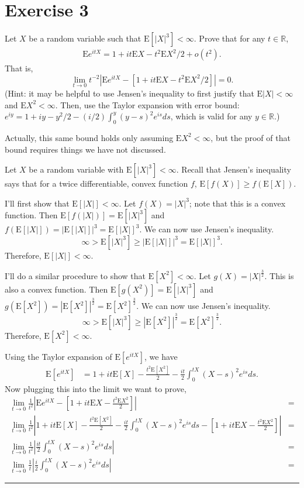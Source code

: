 \documentclass{article}
\theoremstyle{break}
\newenvironment{solution}{{\bf Solution:}}{\hfill\rule{2mm}{2mm}}
\newcommand{\E}{\mathrm{E}}
\newcommand{\R}{\mathbb{R}}
\begin{document}
\section*{Exercise 3}
Let $X$ be a random variable such that $\E[ |X|^{3}] <\infty$.  Prove that for any $t\in\R$,
\begin{align*}
\E e^{itX}=1+it\E X-t^{2}\E X^{2}/2+o(t^{2}).
\end{align*}
That is,
$$\lim_{t \rightarrow 0}t^{-2} |\E e^{itX}-[1+it\E X-t^{2}\E X^{2}/2]|=0.$$
(Hint: it may be helpful to use Jensen's inequality to first justify that $\E |X|<\infty$ and $\E X^{2}<\infty$.  Then, use the Taylor expansion with error bound: $e^{iy}=1+iy-y^{2}/2-(i/2)\int_{0}^{y}(y-s)^{2}e^{is}ds$, which is valid for any $y\in\R$.)

Actually, this same bound holds only assuming $\E X^{2}<\infty$, but the proof of that bound requires things we have not discussed.

\begin{solution}
Let $X$ be a random variable with $\E[|X|^3] < \infty$. Recall that Jensen's inequality says that for a twice differentiable, convex function $f$, $\E[f(X)] \geq f(\E[X])$.

I'll first show that $\E[|X|] < \infty$. Let $f(X) = |X|^3$; note that this is a convex function. 
Then $\E[f(|X|)] = \E[|X|^3]$ and $f(\E[|X|]) = |\E[|X|]|^3 = \E[|X|]^3$. We can now use Jensen's inequality. 
\[ \infty > \E[|X|^3] \geq |\E[|X|]|^3 = \E[|X|]^3.\]
Therefore, $\E[|X|] < \infty$.

I'll do a similar procedure to show that $\E[X^2] < \infty$. Let $g(X) = |X|^\frac{3}{2}$. This is also a convex function. Then $\E[g(X^2)] = \E[|X|^3]$ and $g(\E[X^2]) = |\E[X^2]|^\frac{3}{2} = \E[X^2]^\frac{3}{2}$. We can now use Jensen's inequality. 
\[ \infty > \E[|X|^3] \geq |\E[X^2]|^\frac{3}{2} = \E[X^2]^\frac{3}{2}.\]
Therefore, $\E[X^2] < \infty$.

Using the Taylor expansion of $\E[e^{itX}]$, we have 
\begin{align*}
\E[e^{itX}] &= 1 + it \E[X] - \frac{t^2 \E[X^2]}{2} - \frac{it}{2} \int_0^{tX} (X - s)^2 e^{is} ds.
\end{align*}
Now plugging this into the limit we want to prove, 
\begin{align*}
\lim_{t \rightarrow 0} \frac{1}{t^2} \left|\E e^{itX}-\left[1+it\E X- \frac{t^{2}\E X^{2}}{2}\right]\right| &= \\
\lim_{t \rightarrow 0} \frac{1}{t^2} \left|1 + it \E[X] - \frac{t^2 \E[X^2]}{2} - \frac{it}{2} \int_0^{tX} (X - s)^2 e^{is} ds -\left[1+it\E X- \frac{t^{2}\E X^{2}}{2}\right]\right| &= \\
\lim_{t \rightarrow 0} \frac{1}{t^2} \left|\frac{it}{2} \int_0^{tX} (X - s)^2 e^{is} ds\right| &= \\
\lim_{t \rightarrow 0} \frac{1}{t} \left|\frac{i}{2} \int_0^{tX} (X - s)^2 e^{is} ds\right| &=
\end{align*}

\end{solution}
\end{document}
